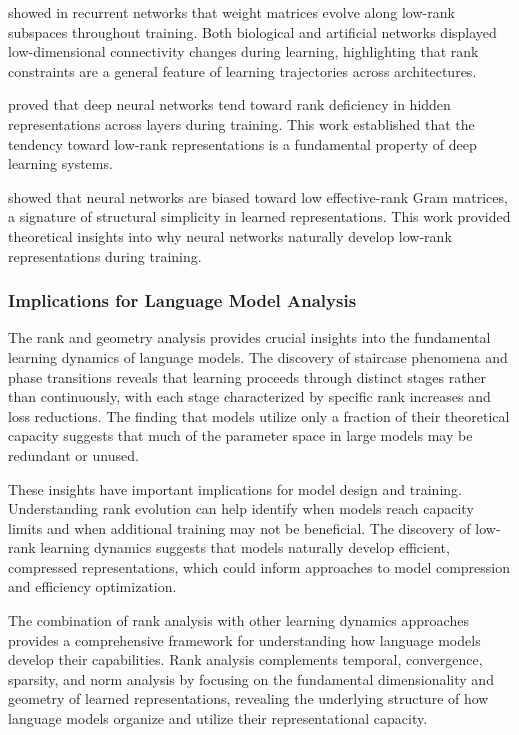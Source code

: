 \citet{pellegrino2023lowrank} showed in recurrent networks that weight matrices evolve along low-rank subspaces throughout training. Both biological and artificial networks displayed low-dimensional connectivity changes during learning, highlighting that rank constraints are a general feature of learning trajectories across architectures.

\citet{feng2022rank} proved that deep neural networks tend toward rank deficiency in hidden representations across layers during training. This work established that the tendency toward low-rank representations is a fundamental property of deep learning systems.

\citet{minyoung2022lowrank} showed that neural networks are biased toward low effective-rank Gram matrices, a signature of structural simplicity in learned representations. This work provided theoretical insights into why neural networks naturally develop low-rank representations during training.

\subsubsection{Implications for Language Model Analysis}

The rank and geometry analysis provides crucial insights into the fundamental learning dynamics of language models. The discovery of staircase phenomena and phase transitions reveals that learning proceeds through distinct stages rather than continuously, with each stage characterized by specific rank increases and loss reductions. The finding that models utilize only a fraction of their theoretical capacity suggests that much of the parameter space in large models may be redundant or unused.

These insights have important implications for model design and training. Understanding rank evolution can help identify when models reach capacity limits and when additional training may not be beneficial. The discovery of low-rank learning dynamics suggests that models naturally develop efficient, compressed representations, which could inform approaches to model compression and efficiency optimization.

The combination of rank analysis with other learning dynamics approaches provides a comprehensive framework for understanding how language models develop their capabilities. Rank analysis complements temporal, convergence, sparsity, and norm analysis by focusing on the fundamental dimensionality and geometry of learned representations, revealing the underlying structure of how language models organize and utilize their representational capacity.

